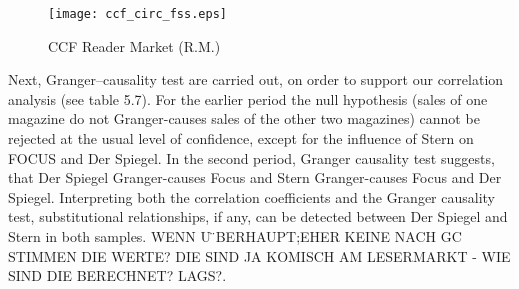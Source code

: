 \documentclass[12pt,a4paper]{scrreprt}
\begin{document}
\begin{figure}[H]
\caption{CCF Reader Market (R.M.)}
	\centering
	\texttt{[image: ccf\_circ\_fss.eps]}
\label{fig_ccf_circ_fss}
\end{figure}

Next, Granger–causality test are carried out, on order to support our correlation analysis (see table 5.7). For the earlier period the null hypothesis (sales of one magazine do not Granger-causes sales of the other two magazines) cannot be rejected at the usual level of confidence, except for the influence of Stern on FOCUS and Der Spiegel. In the second period, Granger causality test suggests, that Der Spiegel Granger-causes Focus and Stern Granger-causes Focus and Der Spiegel. Interpreting both the correlation coefficients and the Granger causality test, substitutional relationships, if any, can be detected between Der Spiegel and Stern in both samples. 
\textcolor[rgb]{1,0.41,0.13}{WENN U ̈BERHAUPT;EHER KEINE NACH GC
STIMMEN DIE WERTE? DIE SIND JA KOMISCH AM LESERMARKT - WIE SIND DIE BERECHNET? LAGS?.}
\end{document}
